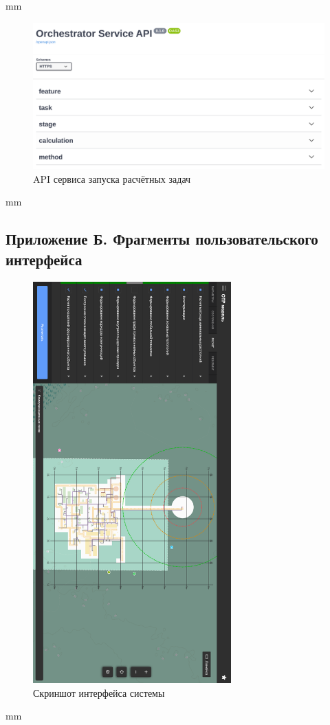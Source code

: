  mm
\begin{figure}[H]
	\includegraphics[width=\textwidth]{applications/pictures/orchestrator_swagger}
	\caption{API сервиса запуска расчётных задач}
	\label{pic:application__orchestrator-swagger}
\end{figure}
 mm




\subsection*{\large{Приложение Б. Фрагменты пользовательского интерфейса}}
\renewcommand{\thefigure}{\arabic{figure}}
\setcounter{figure}{0}

\begin{figure}[H]
	\includegraphics[width=0.68\textwidth]{applications/pictures/system}
	\caption{Скриншот интерфейса системы}
	\label{pic:application__system}
\end{figure}
 mm